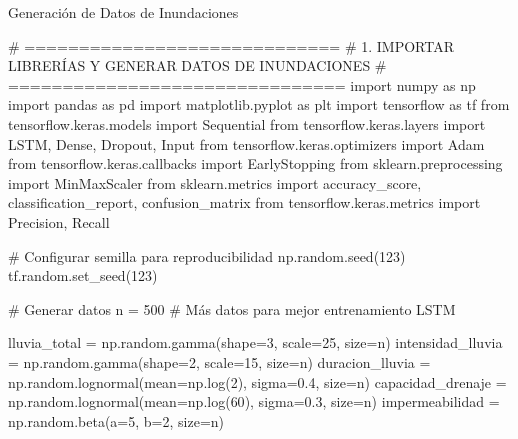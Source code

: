 \documentclass[
  ignorenonframetext,
]{beamer}
\newenvironment{Shaded}{\begin{snugshade}}{\end{snugshade}}
\newcommand{\CommentTok}[1]{\textcolor[rgb]{0.37,0.37,0.37}{#1}}
\newcommand{\DecValTok}[1]{\textcolor[rgb]{0.68,0.00,0.00}{#1}}
\newcommand{\FloatTok}[1]{\textcolor[rgb]{0.68,0.00,0.00}{#1}}
\newcommand{\ImportTok}[1]{\textcolor[rgb]{0.00,0.46,0.62}{#1}}
\newcommand{\NormalTok}[1]{\textcolor[rgb]{0.00,0.23,0.31}{#1}}
\newcommand{\OperatorTok}[1]{\textcolor[rgb]{0.37,0.37,0.37}{#1}}
\begin{document}
\begin{frame}[fragile]{Generación de Datos de Inundaciones}
\label{generaciuxf3n-de-datos-de-inundaciones}
\label{gen-datos}
\begin{Shaded}
\begin{Highlighting}[]
\CommentTok{\# =============================}
\CommentTok{\# 1. IMPORTAR LIBRERÍAS Y GENERAR DATOS DE INUNDACIONES}
\CommentTok{\# ===============================}
\ImportTok{import}\NormalTok{ numpy }\ImportTok{as}\NormalTok{ np}
\ImportTok{import}\NormalTok{ pandas }\ImportTok{as}\NormalTok{ pd}
\ImportTok{import}\NormalTok{ matplotlib.pyplot }\ImportTok{as}\NormalTok{ plt}
\ImportTok{import}\NormalTok{ tensorflow }\ImportTok{as}\NormalTok{ tf}
\ImportTok{from}\NormalTok{ tensorflow.keras.models }\ImportTok{import}\NormalTok{ Sequential}
\ImportTok{from}\NormalTok{ tensorflow.keras.layers }\ImportTok{import}\NormalTok{ LSTM, Dense, Dropout, Input}
\ImportTok{from}\NormalTok{ tensorflow.keras.optimizers }\ImportTok{import}\NormalTok{ Adam}
\ImportTok{from}\NormalTok{ tensorflow.keras.callbacks }\ImportTok{import}\NormalTok{ EarlyStopping}
\ImportTok{from}\NormalTok{ sklearn.preprocessing }\ImportTok{import}\NormalTok{ MinMaxScaler}
\ImportTok{from}\NormalTok{ sklearn.metrics }\ImportTok{import}\NormalTok{ accuracy\_score, classification\_report, confusion\_matrix}
\ImportTok{from}\NormalTok{ tensorflow.keras.metrics }\ImportTok{import}\NormalTok{ Precision, Recall}

\CommentTok{\# Configurar semilla para reproducibilidad}
\NormalTok{np.random.seed(}\DecValTok{123}\NormalTok{)}
\NormalTok{tf.random.set\_seed(}\DecValTok{123}\NormalTok{)}

\CommentTok{\# Generar datos }
\NormalTok{n }\OperatorTok{=} \DecValTok{500}  \CommentTok{\# Más datos para mejor entrenamiento LSTM}

\NormalTok{lluvia\_total }\OperatorTok{=}\NormalTok{ np.random.gamma(shape}\OperatorTok{=}\DecValTok{3}\NormalTok{, scale}\OperatorTok{=}\DecValTok{25}\NormalTok{, size}\OperatorTok{=}\NormalTok{n)}
\NormalTok{intensidad\_lluvia }\OperatorTok{=}\NormalTok{ np.random.gamma(shape}\OperatorTok{=}\DecValTok{2}\NormalTok{, scale}\OperatorTok{=}\DecValTok{15}\NormalTok{, size}\OperatorTok{=}\NormalTok{n)}
\NormalTok{duracion\_lluvia }\OperatorTok{=}\NormalTok{ np.random.lognormal(mean}\OperatorTok{=}\NormalTok{np.log(}\DecValTok{2}\NormalTok{), sigma}\OperatorTok{=}\FloatTok{0.4}\NormalTok{, size}\OperatorTok{=}\NormalTok{n)}
\NormalTok{capacidad\_drenaje }\OperatorTok{=}\NormalTok{ np.random.lognormal(mean}\OperatorTok{=}\NormalTok{np.log(}\DecValTok{60}\NormalTok{), sigma}\OperatorTok{=}\FloatTok{0.3}\NormalTok{, size}\OperatorTok{=}\NormalTok{n)}
\NormalTok{impermeabilidad }\OperatorTok{=}\NormalTok{ np.random.beta(a}\OperatorTok{=}\DecValTok{5}\NormalTok{, b}\OperatorTok{=}\DecValTok{2}\NormalTok{, size}\OperatorTok{=}\NormalTok{n)}


\end{Highlighting}
\end{Shaded}
\end{frame}
\end{document}
